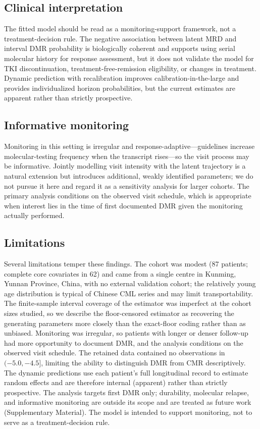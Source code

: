 \documentclass[11pt]{article}
\begin{document}
\subsection{Clinical interpretation}

The fitted model should be read as a monitoring-support framework, not a
treatment-decision rule. The negative association between latent MRD and
interval DMR probability is biologically coherent and supports using
serial molecular history for response assessment, but it does not validate
the model for TKI discontinuation, treatment-free-remission eligibility,
or changes in treatment. Dynamic prediction with recalibration improves
calibration-in-the-large and provides individualized horizon
probabilities, but the current estimates are apparent rather than strictly
prospective.

\subsection{Informative monitoring}

Monitoring in this setting is irregular and response-adaptive---guidelines
increase molecular-testing frequency when the transcript rises---so the
visit process may be informative. Jointly modelling visit intensity with the
latent trajectory is a natural extension but introduces additional, weakly
identified parameters; we do not pursue it here and regard it as a
sensitivity analysis for larger cohorts. The primary analysis conditions on
the observed visit schedule, which is appropriate when interest lies in the
time of first documented DMR given the monitoring actually performed.

\subsection{Limitations}

Several limitations temper these findings. The cohort was modest (87
patients; complete core covariates in 62) and came from a single centre in
Kunming, Yunnan Province, China, with no external validation cohort; the
relatively young age distribution is typical of Chinese CML series and may
limit transportability. The finite-sample interval coverage of the estimator
was imperfect at the cohort sizes studied, so we describe the floor-censored
estimator as recovering the generating parameters more closely than the
exact-floor coding rather than as unbiased. Monitoring was irregular, so
patients with longer or denser follow-up had more opportunity to document
DMR, and the analysis conditions on the observed visit schedule. The
retained data contained no observations in $(-5.0,-4.5]$, limiting the
ability to distinguish DMR from CMR descriptively. The dynamic predictions
use each patient's full longitudinal record to estimate random effects and
are therefore internal (apparent) rather than strictly prospective. The
analysis targets first DMR only; durability, molecular relapse, and
informative monitoring are outside its scope and are treated as future work
(Supplementary Material). The model is intended to support monitoring, not to
serve as a treatment-decision rule.
\end{document}
